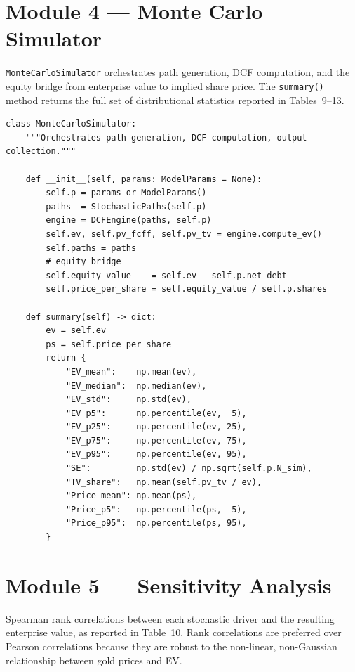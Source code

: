 \section*{Module 4 — Monte Carlo Simulator}

\texttt{MonteCarloSimulator} orchestrates path generation, DCF
computation, and the equity bridge from enterprise value to implied
share price. The \texttt{summary()} method returns the full set of
distributional statistics reported in Tables~9--13.

\begin{lstlisting}[style=python, caption={MonteCarloSimulator — orchestration and equity bridge}]
class MonteCarloSimulator:
    """Orchestrates path generation, DCF computation, output collection."""

    def __init__(self, params: ModelParams = None):
        self.p = params or ModelParams()
        paths  = StochasticPaths(self.p)
        engine = DCFEngine(paths, self.p)
        self.ev, self.pv_fcff, self.pv_tv = engine.compute_ev()
        self.paths = paths
        # equity bridge
        self.equity_value    = self.ev - self.p.net_debt
        self.price_per_share = self.equity_value / self.p.shares

    def summary(self) -> dict:
        ev = self.ev
        ps = self.price_per_share
        return {
            "EV_mean":    np.mean(ev),
            "EV_median":  np.median(ev),
            "EV_std":     np.std(ev),
            "EV_p5":      np.percentile(ev,  5),
            "EV_p25":     np.percentile(ev, 25),
            "EV_p75":     np.percentile(ev, 75),
            "EV_p95":     np.percentile(ev, 95),
            "SE":         np.std(ev) / np.sqrt(self.p.N_sim),
            "TV_share":   np.mean(self.pv_tv / ev),
            "Price_mean": np.mean(ps),
            "Price_p5":   np.percentile(ps,  5),
            "Price_p95":  np.percentile(ps, 95),
        }
\end{lstlisting}

\section*{Module 5 — Sensitivity Analysis}

Spearman rank correlations between each stochastic driver and the
resulting enterprise value, as reported in Table~10. Rank
correlations are preferred over Pearson correlations because they are
robust to the non-linear, non-Gaussian relationship between gold
prices and EV.


